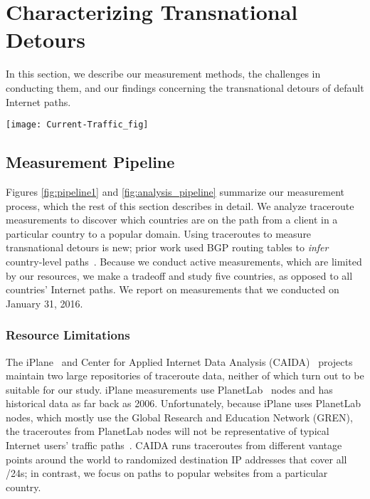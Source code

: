 \section{Characterizing Transnational Detours}
\label{datasets}
In this section, we describe our measurement methods, the challenges in
conducting them, and our findings concerning the transnational detours
of default Internet paths.

\begin{figure*}[t]
\centering
\texttt{[image: Current-Traffic\_fig]}
\caption{Measurement pipeline to study Internet paths from countries to
  popular domains.}
\label{fig:pipeline1}
\end{figure*}


\subsection{Measurement Pipeline}
\label{pipeline}

Figures \ref{fig:pipeline1} and \ref{fig:analysis_pipeline} summarize our measurement
process, which the rest of this section describes in detail.  We analyze
traceroute measurements to discover which countries are on the path from
a client in a particular country to a popular domain.  Using traceroutes
to measure transnational detours is new; prior work used BGP routing
tables to \textit{infer} country-level paths~\cite{karlin2009nation}.
Because we conduct active measurements, which are limited by our
resources, we make a tradeoff and study five countries, as opposed to
all countries' Internet paths.  We report on measurements that we
conducted on January 31, 2016.

\subsubsection{Resource Limitations}
\label{resource_limits}

The iPlane~\cite{madhyastha2006iplane} and Center for Applied
Internet Data Analysis (CAIDA)~\cite{caida} projects maintain two large
repositories of traceroute data, neither of which turn out to be
suitable for our study.  iPlane measurements use
PlanetLab~\cite{planetlab} nodes and has historical data as far back as
2006.  Unfortunately, because iPlane uses PlanetLab nodes, which 
mostly use the Global Research and Education Network
(GREN), the traceroutes from PlanetLab nodes will not be representative
of typical Internet users' traffic paths~\cite{banerjee2004interdomain}.
CAIDA runs traceroutes from different vantage points around the world to
randomized destination IP addresses that cover all /24s; in 
contrast, we focus on paths to popular websites from a particular
country.

